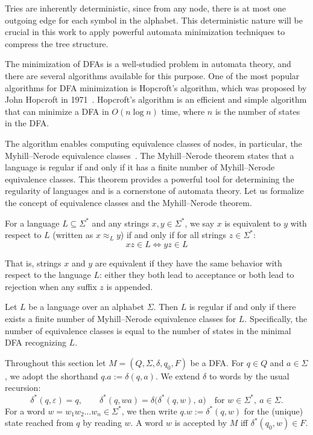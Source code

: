 Tries are inherently deterministic, since from any node, there is at most one outgoing edge for each symbol in the alphabet. 
This deterministic nature will be crucial in this work to apply powerful automata minimization techniques to compress the tree structure.

The minimization of DFAs is a well-studied problem in automata theory, and there are several algorithms available for this purpose. One of the most popular algorithms for DFA minimization is Hopcroft's algorithm, which was proposed by John Hopcroft in 1971~\cite{HOPCROFT1971189}. Hopcroft's algorithm is an efficient and simple algorithm that can minimize a DFA in $O(n \log n)$ time, where $n$ is the number of states in the DFA.

The algorithm enables computing equivalence classes of nodes, in particular, the Myhill--Nerode equivalence classes~\cite{nerode1958linear, myhill1957finite}. The Myhill--Nerode theorem states that a language is regular if and only if it has a finite number of Myhill--Nerode equivalence classes. This theorem provides a powerful tool for determining the regularity of languages and is a cornerstone of automata theory. Let us formalize the concept of equivalence classes and the Myhill--Nerode theorem.

\begin{definition}
    For a language $L \subseteq \Sigma^*$ and any strings $x,y \in \Sigma^*$, we say $x$ is equivalent to $y$ with respect to $L$ (written as $x \approx_L y$) if and only if for all strings $z \in \Sigma^*$:
    \[ xz \in L \Leftrightarrow yz \in L \]
\end{definition}
That is, strings $x$ and $y$ are equivalent if they have the same behavior with respect to the language $L$: either they both lead to acceptance or both lead to rejection when any suffix $z$ is appended.

\begin{theorem} \label{def:myhill-nerode}
    Let $L$ be a language over an alphabet $\Sigma$. Then $L$ is regular if and only if there exists a finite number of Myhill--Nerode equivalence classes for $L$. Specifically, the number of equivalence classes is equal to the number of states in the minimal DFA recognizing $L$.
\end{theorem}

Throughout this section let $M = (Q, \Sigma, \delta, q_0, F)$ be a DFA. For $q \in Q$ and $a \in \Sigma$, we adopt the shorthand $q.a := \delta(q,a)$. We extend $\delta$ to words by the usual recursion:
\[
\delta^{*}(q,\varepsilon) = q, \qquad
\delta^{*}(q,wa) = \delta\bigl(\delta^{*}(q,w),\, a\bigr) \quad \text{for } w \in \Sigma^{*},\ a \in \Sigma .
\]
For a word $w = w_1 w_2 \dots w_n \in \Sigma^{*}$, we then write $q.w := \delta^{*}(q,w)$ for the (unique) state reached from $q$ by reading $w$. A word $w$ is accepted by $M$ iff $\delta^{*}(q_0,w) \in F$.

